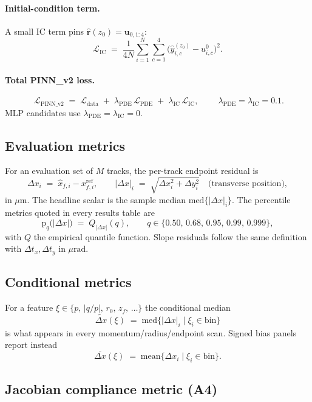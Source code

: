 \documentclass[11pt,a4paper]{article}
\begin{document}
\paragraph{Initial-condition term.} A small IC term pins
$\hat{\mathbf{r}}(z_0)=\mathbf{u}_{0,1:4}$:
\[
  \mathcal{L}_{\mathrm{IC}} \;=\; \frac{1}{4N}\sum_{i=1}^{N}\sum_{c=1}^{4}\bigl(\hat{y}^{(z_0)}_{i,c}-u^{0}_{i,c}\bigr)^{2}.
\]

\paragraph{Total PINN\_v2 loss.}
\[
  \boxed{\;
  \mathcal{L}_{\mathrm{PINN\_v2}}
  \;=\; \mathcal{L}_{\mathrm{data}} \;+\; \lambda_{\mathrm{PDE}}\,\mathcal{L}_{\mathrm{PDE}}
        \;+\; \lambda_{\mathrm{IC}}\,\mathcal{L}_{\mathrm{IC}},
  \;}
  \qquad \lambda_{\mathrm{PDE}}=\lambda_{\mathrm{IC}}=0.1.
\]
MLP candidates use $\lambda_{\mathrm{PDE}}=\lambda_{\mathrm{IC}}=0$.

\subsection{Evaluation metrics}

For an evaluation set of $M$ tracks, the per-track endpoint residual
is
\[
  \Delta x_i \;=\; \hat{x}_{f,i} - x^{\mathrm{ref}}_{f,i},\qquad
  |\Delta x|_i \;=\; \sqrt{\Delta x_i^{2}+\Delta y_i^{2}}\quad\text{(transverse position)},
\]
in $\mu\mathrm{m}$. The headline scalar is the sample median
$\mathrm{med}\{|\Delta x|_i\}$. The percentile metrics quoted in
every results table are
\[
  \mathrm{p}_{q}\bigl(|\Delta x|\bigr)
  \;=\; Q_{|\Delta x|}(q),\qquad q\in\{0.50,\,0.68,\,0.95,\,0.99,\,0.999\},
\]
with $Q$ the empirical quantile function. Slope residuals follow the
same definition with $\Delta t_x,\Delta t_y$ in $\mu\mathrm{rad}$.

\subsection{Conditional metrics}

For a feature $\xi\in\{p,\,|q/p|,\,r_0,\,z_f,\,\ldots\}$ the
conditional median
\[
  \widetilde{\Delta x}(\xi)
  \;=\; \mathrm{med}\bigl\{|\Delta x|_i\;\big|\;\xi_i\in\mathrm{bin}\bigr\}
\]
is what appears in every momentum/radius/endpoint scan. Signed bias
panels report instead
\[
  \overline{\Delta x}(\xi) \;=\; \mathrm{mean}\bigl\{\Delta x_i\;|\;\xi_i\in\mathrm{bin}\bigr\}.
\]

\subsection{Jacobian compliance metric (A4)}
\end{document}
